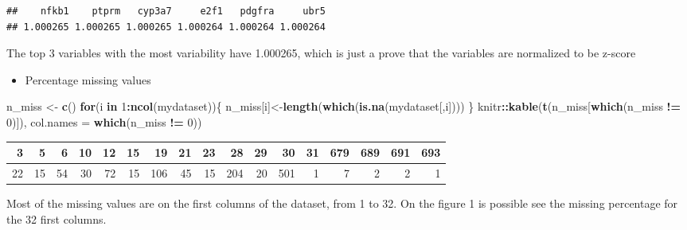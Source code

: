 \documentclass[
]{article}
\newenvironment{Shaded}{\begin{snugshade}}{\end{snugshade}}
\newcommand{\ControlFlowTok}[1]{\textcolor[rgb]{0.13,0.29,0.53}{\textbf{#1}}}
\newcommand{\DataTypeTok}[1]{\textcolor[rgb]{0.13,0.29,0.53}{#1}}
\newcommand{\DecValTok}[1]{\textcolor[rgb]{0.00,0.00,0.81}{#1}}
\newcommand{\KeywordTok}[1]{\textcolor[rgb]{0.13,0.29,0.53}{\textbf{#1}}}
\newcommand{\NormalTok}[1]{#1}
\newcommand{\OperatorTok}[1]{\textcolor[rgb]{0.81,0.36,0.00}{\textbf{#1}}}
\newcommand{\StringTok}[1]{\textcolor[rgb]{0.31,0.60,0.02}{#1}}
\providecommand{\tightlist}{%
  \setlength{\itemsep}{0pt}\setlength{\parskip}{0pt}}
\begin{document}
\begin{verbatim}
##    nfkb1    ptprm   cyp3a7     e2f1   pdgfra     ubr5 
## 1.000265 1.000265 1.000265 1.000264 1.000264 1.000264
\end{verbatim}

The top 3 variables with the most variability have 1.000265, which is
just a prove that the variables are normalized to be z-score

\begin{itemize}
\tightlist
\item
  Percentage missing values
\end{itemize}

\begin{Shaded}
\begin{Highlighting}[]
\NormalTok{n_miss <-}\StringTok{ }\KeywordTok{c}\NormalTok{()}
\ControlFlowTok{for}\NormalTok{(i }\ControlFlowTok{in} \DecValTok{1}\OperatorTok{:}\KeywordTok{ncol}\NormalTok{(mydataset))\{}
\NormalTok{  n_miss[i]<-}\KeywordTok{length}\NormalTok{(}\KeywordTok{which}\NormalTok{(}\KeywordTok{is.na}\NormalTok{(mydataset[,i])))}
\NormalTok{\}}
\NormalTok{knitr}\OperatorTok{::}\KeywordTok{kable}\NormalTok{(}\KeywordTok{t}\NormalTok{(n_miss[}\KeywordTok{which}\NormalTok{(n_miss }\OperatorTok{!=}\StringTok{ }\DecValTok{0}\NormalTok{)]), }\DataTypeTok{col.names =} \KeywordTok{which}\NormalTok{(n_miss }\OperatorTok{!=}\StringTok{ }\DecValTok{0}\NormalTok{))}
\end{Highlighting}
\end{Shaded}

\begin{longtable}[]{@{}rrrrrrrrrrrrrrrrr@{}}
\toprule
3 & 5 & 6 & 10 & 12 & 15 & 19 & 21 & 23 & 28 & 29 & 30 & 31 & 679 & 689
& 691 & 693\tabularnewline
\midrule
\endhead
22 & 15 & 54 & 30 & 72 & 15 & 106 & 45 & 15 & 204 & 20 & 501 & 1 & 7 & 2
& 2 & 1\tabularnewline
\bottomrule
\end{longtable}

Most of the missing values are on the first columns of the dataset, from
1 to 32. On the figure 1 is possible see the missing percentage for the
32 first columns.

\begin{Shaded}
\end{Shaded}
\end{document}
